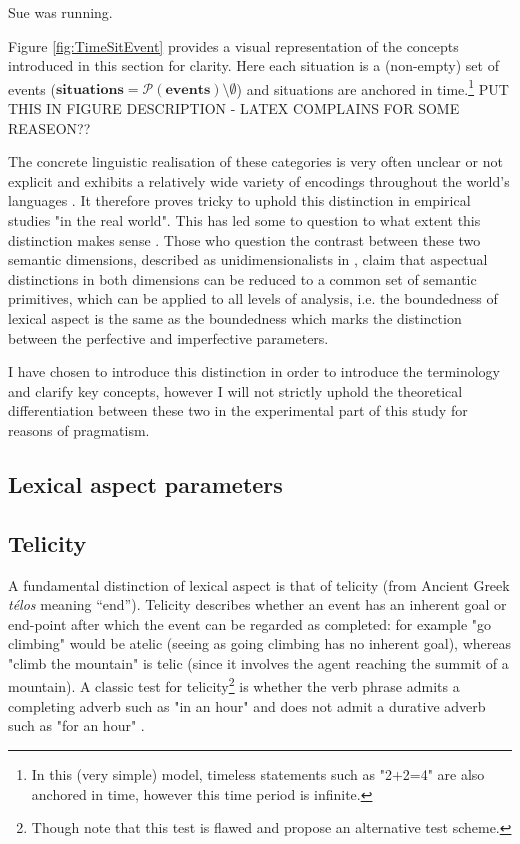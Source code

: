\begin{exe}
    \ex Sue was running.
    \label{sent:sue_running}
\end{exe}
Figure \ref{fig:TimeSitEvent} provides a visual representation of the concepts introduced in this section for clarity. Here each situation is a (non-empty) set of events ($\mathbf{situations} = \mathcal{P}(\mathbf{events}) \setminus \emptyset$) and situations are anchored in time.\footnote{In this (very simple) model, timeless statements such as "2+2=4" are also anchored in time, however this time period is infinite.} PUT THIS IN FIGURE DESCRIPTION - LATEX COMPLAINS FOR SOME REASEON??

The concrete linguistic realisation of these categories is very often unclear or not explicit and exhibits a relatively wide variety of encodings throughout the world’s languages \citep{Dahl1985TenseAA}. It therefore proves tricky to uphold this distinction in empirical studies "in the real world". This has led some to question to what extent this distinction makes sense \citep{Sasse2002RecentAI}. Those who question the contrast between these two semantic dimensions, described as unidimensionalists in \citet{Sasse2002RecentAI}, claim that aspectual distinctions in both dimensions can be reduced to a common set of semantic primitives, which can be applied to all levels of analysis, i.e. the boundedness of lexical aspect is the same as the boundedness which marks the distinction between the perfective and imperfective parameters. 

I have chosen to introduce this distinction in order to introduce the terminology and clarify key concepts, however I will not strictly uphold the theoretical differentiation between these two in the experimental part of this study for reasons of pragmatism.

\subsection{Lexical aspect parameters}
\subsection*{Telicity}
A fundamental distinction of lexical aspect is that of telicity (from Ancient Greek \emph{télos} meaning “end”). Telicity describes whether an event has an inherent goal or end-point after which the event can be regarded as completed: for example "go climbing" would be atelic (seeing as going climbing has no inherent goal), whereas "climb the mountain" is telic (since it involves the agent reaching the summit of a mountain). A classic test for telicity\footnote{Though \citet{XiaoMcenery+2006+1+21} note that this test is flawed and propose an alternative test scheme.} is whether the verb phrase admits a completing adverb such as "in an hour" and does not admit a durative adverb such as "for an hour" \citep{Krifka1998TheOO}.

